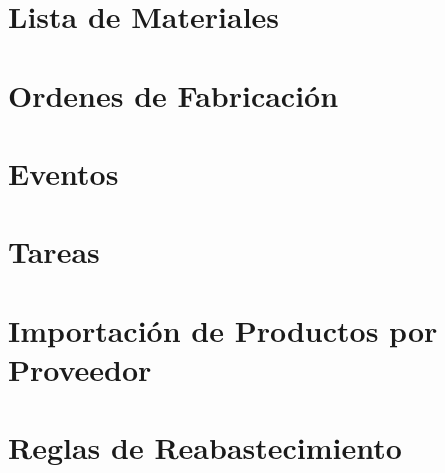 \documentclass[letterpaper,10pt,spanish]{sphinxmanual}
\begin{document}
\section{Lista de Materiales}
\label{\detokenize{funcional/fabricacion/lista-de-materiales:lista-de-materiales}}\label{\detokenize{funcional/fabricacion/lista-de-materiales:id1}}\label{\detokenize{funcional/fabricacion/lista-de-materiales::doc}}

\section{Ordenes de Fabricación}
\label{\detokenize{funcional/fabricacion/ordenes-de-fabricacion:ordenes-de-fabricacion}}\label{\detokenize{funcional/fabricacion/ordenes-de-fabricacion:id1}}\label{\detokenize{funcional/fabricacion/ordenes-de-fabricacion::doc}}


\section{Eventos}
\label{\detokenize{funcional/eventos:eventos}}\label{\detokenize{funcional/eventos:id1}}\label{\detokenize{funcional/eventos::doc}}


\section{Tareas}
\label{\detokenize{funcional/proyectos/tareas:tareas}}\label{\detokenize{funcional/proyectos/tareas:id1}}\label{\detokenize{funcional/proyectos/tareas::doc}}


\section{Importación de Productos por Proveedor}
\label{\detokenize{funcional/compras/informacion-de-productos-por-proveedor:importacion-de-productos-por-proveedor}}\label{\detokenize{funcional/compras/informacion-de-productos-por-proveedor:importacion-de-produtos-por-proveedor}}\label{\detokenize{funcional/compras/informacion-de-productos-por-proveedor::doc}}

\section{Reglas de Reabastecimiento}
\label{\detokenize{funcional/compras/reglas-de-reabastecimiento:reglas-de-reabastecimiento}}\label{\detokenize{funcional/compras/reglas-de-reabastecimiento:reglas-re-reabastecimiento}}\label{\detokenize{funcional/compras/reglas-de-reabastecimiento::doc}}
\end{document}
